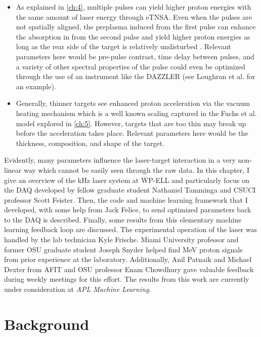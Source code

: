 \begin{itemize}
\item As explained in \autoref{ch:4}, multiple pulses can yield higher proton energies with the same amount of laser energy through \gls{eTNSA}. Even when the pulses are not spatially aligned, the preplasma induced from the first pulse can enhance the absorption in from the second pulse and yield higher proton energies as long as the rear side of the target is relatively undisturbed \cite{Macchi_2013_RevModPhys}. Relevant parameters here would be pre-pulse contrast, time delay between pulses, and a variety of other spectral properties of the pulse could even be optimized through the use of an instrument like the DAZZLER (see Loughran et al. \cite{Loughran_2023_HPLSE} for an example). 

\item Generally, thinner targets see enhanced proton acceleration via the vacuum heating mechanism which is a well known scaling captured in the Fuchs et al. \cite{Fuchs_2005_Nat} model explored in \autoref{ch:5}. However, targets that are too thin may break up before the acceleration takes place. Relevant parameters here would be the thickness, composition, and shape of the target. 
\end{itemize}
Evidently, many parameters influence the laser-target interaction in a very non-linear way which cannot be easily seen through the raw data. In this chapter, I give an overview of the kHz laser system at \gls{WP-ELL} and particularly focus on the \gls{DAQ} developed by fellow graduate student Nathaniel Tamminga and \gls{CSUCI} professor Scott Feister. Then, the code and machine learning framework that I developed, with some help from Jack Felice, to send optimized parameters back to the \gls{DAQ} is described. Finally, some results from this elementary machine learning feedback loop are discussed. The experimental operation of the laser was handled by the lab technician Kyle Frische. Miami University professor and former OSU graduate student Joseph Snyder helped find MeV proton signals from prior experience at the laboratory. Additionally, Anil Patnaik and Michael Dexter from AFIT and OSU professor Enam Chowdhury gave valuable feedback during weekly meetings for this effort. The results from this work are currently under consideration at \emph{APL Machine Learning}.

\section{Background}

